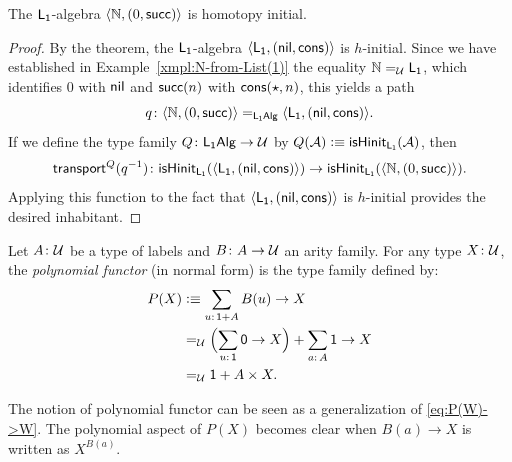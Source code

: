 \begin{cor}
    The\/ $\mathsf{L}_{\mathsf{1}}$-algebra\/ $\langle\mathbb{N},(0, \mathsf{succ})\rangle$ is homotopy initial.
\end{cor}

\begin{proof}
    By the theorem, the $\mathsf{L}_{\mathsf{1}}$-algebra $\langle\mathsf{L}_{\mathsf{1}},(\mathsf{nil}, \mathsf{cons})\rangle$ is $h$-initial. Since we have established in Example~\ref{xmpl:N-from-List(1)} the equality $\mathbb{N}\mathrel{=_{\mathcal U}}\mathsf{L}_{\mathsf{1}}$, which identifies $0$ with $\mathsf{nil}$ and $\mathsf{succ}(n)$ with $\mathsf{cons}({\mathsf{\star}},n)$, this yields a path
    \[
        q\colon
        \dep{\N,(0,\fun{succ})}
        \eq{\fun L_{\fun1}\fun{Alg}}
        \dep{\fun L_{\fun1},(\fun{nil},\fun{cons})}.
    \]
    If we define the type family $Q\colon\fun L_{\fun1}\fun{Alg}\to\univ$ by $Q(\mathcal{A})\mathrel{\vcentcolon}\equiv\mathsf{isHinit}_{\mathsf{L}_{\mathsf{1}}}(\mathcal{A})$, then
    \[
        \fun{transport}^Q(q^{-1}) \colon 
        \fun{isHinit}_{\fun L_{\fun1}}(\dep{\fun L_{\fun1},(\fun{nil},\fun{cons})}) 
        \to 
        \fun{isHinit}_{\fun L_{\fun1}}(\dep{\N,(0,\fun{succ})}).
    \]
    Applying this function to the fact that $\langle\mathsf{L}_{\mathsf{1}},(\mathsf{nil},\mathsf{cons})\rangle$ is $h$-initial provides the desired inhabitant.
\end{proof}

\begin{defn}
    Let $A\colon\univ$ be a type of labels and $B\colon A\to\univ$ an arity family. For any type $X\colon\univ$, the \textsl{polynomial functor} (in normal form) is the type family defined by:
    \begin{align*}
         P(X)&\defeq\sum_{u\colon\fun1+A}B(u)\to X\\
         &\eq{\univ}
            \Bigl(
                \sum_{u\colon\fun1}
                    \fun0\to X
            \Bigr)
            +\sum_{a\colon A}\fun1\to X\\
         &\eq{\univ}\fun1+A\times X.
     \end{align*}
\end{defn}

\begin{rem}
    The notion of polynomial functor can be seen as a generalization of \eqref{eq:P(W)->W}. The polynomial aspect of $P(X)$ becomes clear when $B(a)\to X$ is written as $X^{B(a)}$.
\end{rem}


